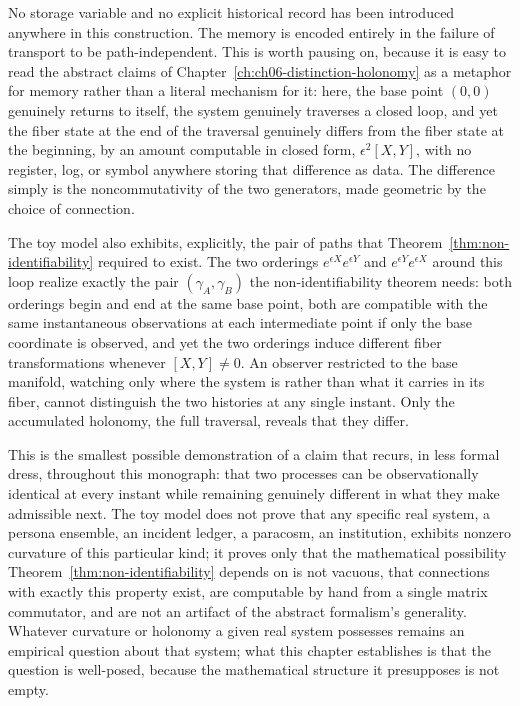 No storage variable and no explicit historical record has been introduced anywhere in this construction. The memory is encoded entirely in the failure of transport to be path-independent. This is worth pausing on, because it is easy to read the abstract claims of Chapter~\ref{ch:ch06-distinction-holonomy} as a metaphor for memory rather than a literal mechanism for it: here, the base point $(0,0)$ genuinely returns to itself, the system genuinely traverses a closed loop, and yet the fiber state at the end of the traversal genuinely differs from the fiber state at the beginning, by an amount computable in closed form, $\epsilon^2[X,Y]$, with no register, log, or symbol anywhere storing that difference as data. The difference simply is the noncommutativity of the two generators, made geometric by the choice of connection.

The toy model also exhibits, explicitly, the pair of paths that Theorem~\ref{thm:non-identifiability} required to exist. The two orderings $e^{\epsilon X} e^{\epsilon Y}$ and $e^{\epsilon Y} e^{\epsilon X}$ around this loop realize exactly the pair $(\gamma_A, \gamma_B)$ the non-identifiability theorem needs: both orderings begin and end at the same base point, both are compatible with the same instantaneous observations at each intermediate point if only the base coordinate is observed, and yet the two orderings induce different fiber transformations whenever $[X,Y] \neq 0$. An observer restricted to the base manifold, watching only where the system is rather than what it carries in its fiber, cannot distinguish the two histories at any single instant. Only the accumulated holonomy, the full traversal, reveals that they differ.

This is the smallest possible demonstration of a claim that recurs, in less formal dress, throughout this monograph: that two processes can be observationally identical at every instant while remaining genuinely different in what they make admissible next. The toy model does not prove that any specific real system, a persona ensemble, an incident ledger, a paracosm, an institution, exhibits nonzero curvature of this particular kind; it proves only that the mathematical possibility Theorem~\ref{thm:non-identifiability} depends on is not vacuous, that connections with exactly this property exist, are computable by hand from a single matrix commutator, and are not an artifact of the abstract formalism's generality. Whatever curvature or holonomy a given real system possesses remains an empirical question about that system; what this chapter establishes is that the question is well-posed, because the mathematical structure it presupposes is not empty.
